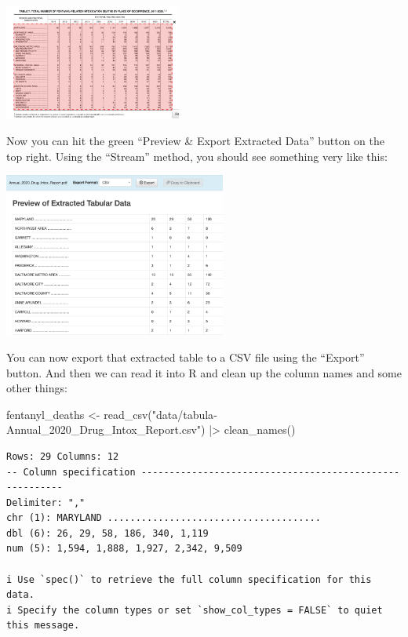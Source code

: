 \documentclass[
  letterpaper,
  DIV=11,
  numbers=noendperiod]{scrreprt}
\newenvironment{Shaded}{\begin{snugshade}}{\end{snugshade}}
\newcommand{\FunctionTok}[1]{\textcolor[rgb]{0.28,0.35,0.67}{#1}}
\newcommand{\NormalTok}[1]{\textcolor[rgb]{0.00,0.23,0.31}{#1}}
\newcommand{\OtherTok}[1]{\textcolor[rgb]{0.00,0.23,0.31}{#1}}
\newcommand{\SpecialCharTok}[1]{\textcolor[rgb]{0.37,0.37,0.37}{#1}}
\newcommand{\StringTok}[1]{\textcolor[rgb]{0.13,0.47,0.30}{#1}}
\begin{document}
\includegraphics[width=2.29in,height=\textheight]{./images/md_fentanyl_deaths_3.png}

Now you can hit the green ``Preview \& Export Extracted Data'' button on
the top right. Using the ``Stream'' method, you should see something
very like this:

\includegraphics[width=2.87in,height=\textheight]{./images/md_fentanyl_deaths_4.png}

You can now export that extracted table to a CSV file using the
``Export'' button. And then we can read it into R and clean up the
column names and some other things:

\begin{Shaded}
\begin{Highlighting}[]
\NormalTok{fentanyl\_deaths }\OtherTok{\textless{}{-}} \FunctionTok{read\_csv}\NormalTok{(}\StringTok{"data/tabula{-}Annual\_2020\_Drug\_Intox\_Report.csv"}\NormalTok{) }\SpecialCharTok{|\textgreater{}} \FunctionTok{clean\_names}\NormalTok{()}
\end{Highlighting}
\end{Shaded}

\begin{verbatim}
Rows: 29 Columns: 12
-- Column specification --------------------------------------------------------
Delimiter: ","
chr (1): MARYLAND ......................................
dbl (6): 26, 29, 58, 186, 340, 1,119
num (5): 1,594, 1,888, 1,927, 2,342, 9,509

i Use `spec()` to retrieve the full column specification for this data.
i Specify the column types or set `show_col_types = FALSE` to quiet this message.
\end{verbatim}
\end{document}
